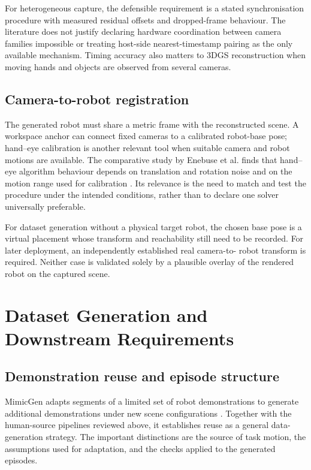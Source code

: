 For heterogeneous capture, the defensible requirement is a stated
synchronisation procedure with measured residual offsets and dropped-frame
behaviour. The literature does not justify declaring hardware coordination
between camera families impossible or treating host-side nearest-timestamp
pairing as the only available mechanism. Timing accuracy also matters to
3DGS reconstruction when moving hands and objects are observed from several
cameras.

\subsection{Camera-to-robot registration}

The generated robot must share a metric frame with the reconstructed scene.
A workspace anchor can connect fixed cameras to a calibrated robot-base pose;
hand--eye calibration is another relevant tool when suitable camera and robot
motions are available. The comparative study by Enebuse et al. finds that
hand--eye algorithm behaviour depends on translation and rotation noise and
on the motion range used for calibration \cite{alihandeye}. Its relevance
is the need to match and test the procedure under the intended conditions,
rather than to declare one solver universally preferable.

For dataset generation without a physical target robot, the chosen base pose
is a virtual placement whose transform and reachability still need to be
recorded. For later deployment, an independently established real camera-to-
robot transform is required. Neither case is validated solely by a plausible
overlay of the rendered robot on the captured scene.

\section{Dataset Generation and Downstream Requirements}
\label{sec:lit-dataset}

\subsection{Demonstration reuse and episode structure}

MimicGen adapts segments of a limited set of robot demonstrations to generate
additional demonstrations under new scene configurations \cite{mimicgen}.
Together with the human-source pipelines reviewed above, it establishes
reuse as a general data-generation strategy. The important distinctions are
the source of task motion, the assumptions used for adaptation, and the checks
applied to the generated episodes.

